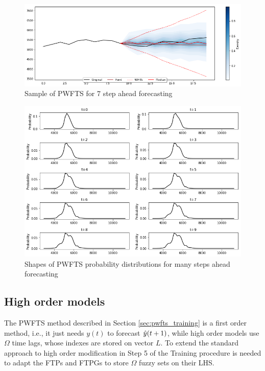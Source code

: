 \begin{figure}[htb]
    \centering
    \includegraphics[width=\textwidth]{figures/pwfts_sample_manystep.png}
    \caption{Sample of PWFTS for 7 step ahead forecasting}
    \label{fig:pwfts_sample_manystep}
\end{figure}

\begin{figure}[htb]
    \centering
    \includegraphics[width=\textwidth]{figures/pwfts_sample_manystep_tiled.png}
    \caption{Shapes of PWFTS probability distributions for many steps ahead forecasting}
    \label{fig:pwfts_sample_manystep_tiled}
\end{figure}

\subsection{High order models}
\label{sec:pwfts_high_order}

The PWFTS method described in Section \ref{sec:pwfts_training} is a first order method, i.e., it just needs $y(t)$ to forecast $\hat{y}(t+1)$, while high order models use $\Omega$ time lags, whose indexes are stored on vector $L$. To extend the standard approach to high order  modification in Step 5 of the Training procedure is needed to adapt the FTPs and FTPGs to store $\Omega$ fuzzy sets on their LHS.

